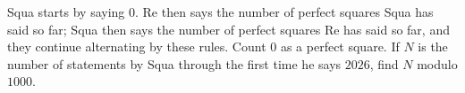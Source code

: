 Squa starts by saying $0$. Re then says the number of perfect squares Squa has said so far; Squa then says the number of perfect squares Re has said so far, and they continue alternating by these rules. Count $0$ as a perfect square. If $N$ is the number of statements by Squa through the first time he says $2026$, find $N$ modulo $1000$.
